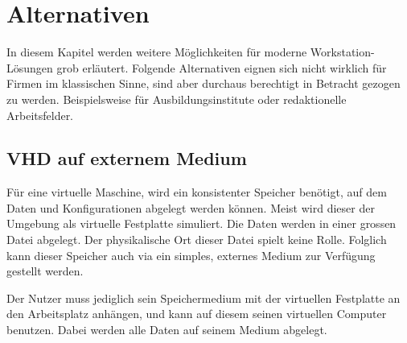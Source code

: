 




\section{Alternativen}
In diesem Kapitel werden weitere Möglichkeiten für moderne Workstation-Lösungen grob erläutert.
Folgende Alternativen eignen sich nicht wirklich für Firmen im klassischen Sinne, sind aber durchaus berechtigt in Betracht gezogen zu werden. Beispielsweise für Ausbildungsinstitute oder redaktionelle Arbeitsfelder.

\subsection{VHD auf externem Medium}
Für eine virtuelle Maschine, wird ein konsistenter Speicher benötigt, auf dem Daten und Konfigurationen abgelegt werden können.
Meist wird dieser der Umgebung als virtuelle Festplatte simuliert. Die Daten werden in einer grossen Datei abgelegt. Der physikalische Ort dieser Datei spielt keine Rolle.
Folglich kann dieser Speicher auch via ein simples, externes Medium zur Verfügung gestellt werden.

Der Nutzer muss jediglich sein Speichermedium mit der virtuellen Festplatte an den Arbeitsplatz anhängen, und kann auf diesem seinen virtuellen Computer benutzen.
Dabei werden alle Daten auf seinem Medium abgelegt.

